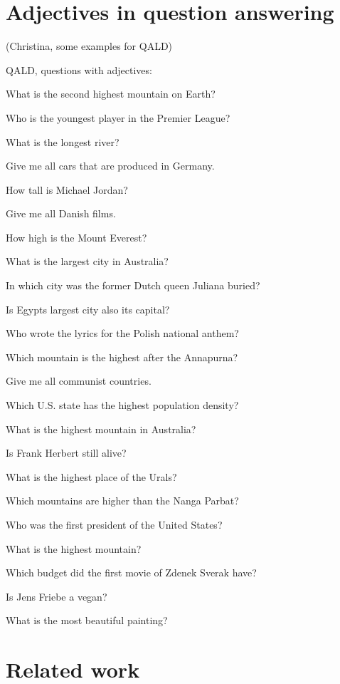 \documentclass[11pt]{article}
\begin{document}
\section{Adjectives in question answering}

(Christina, some examples for QALD)

QALD, questions with adjectives:

What is the second highest mountain on Earth?

Who is the youngest player in the Premier League?

What is the longest river?

Give me all cars that are produced in Germany.

How tall is Michael Jordan?

Give me all Danish films.

How high is the Mount Everest?

What is the largest city in Australia?

In which city was the former Dutch queen Juliana buried?

Is Egypts largest city also its capital?

Who wrote the lyrics for the Polish national anthem?

Which mountain is the highest after the Annapurna?

Give me all communist countries.

Which U.S. state has the highest population density?

What is the highest mountain in Australia?

Is Frank Herbert still alive?

What is the highest place of the Urals?

Which mountains are higher than the Nanga Parbat?

Who was the first president of the United States?

What is the highest mountain?

Which budget did the first movie of Zdenek Sverak have?

Is Jens Friebe a vegan?

What is the most beautiful painting?

\section{Related work}
\end{document}
